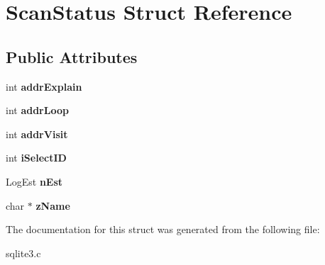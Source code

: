 \hypertarget{structScanStatus}{}\section{Scan\+Status Struct Reference}
\label{structScanStatus}
\subsection*{Public Attributes}
\begin{DoxyCompactItemize}
\item 
int {\bfseries addr\+Explain}\hypertarget{structScanStatus_a621d9ae1f07b7730f1e5e2a5a0473a2e}{}\label{structScanStatus_a621d9ae1f07b7730f1e5e2a5a0473a2e}

\item 
int {\bfseries addr\+Loop}\hypertarget{structScanStatus_a9a6acff15920d8de4b97a3d3fd6781d9}{}\label{structScanStatus_a9a6acff15920d8de4b97a3d3fd6781d9}

\item 
int {\bfseries addr\+Visit}\hypertarget{structScanStatus_a31523fd6dd0dfca1233b51606140b740}{}\label{structScanStatus_a31523fd6dd0dfca1233b51606140b740}

\item 
int {\bfseries i\+Select\+ID}\hypertarget{structScanStatus_a04e5536574db523ebfcdbecdfa39568a}{}\label{structScanStatus_a04e5536574db523ebfcdbecdfa39568a}

\item 
Log\+Est {\bfseries n\+Est}\hypertarget{structScanStatus_af8666388f46040047c5e4bc9097d0336}{}\label{structScanStatus_af8666388f46040047c5e4bc9097d0336}

\item 
char $\ast$ {\bfseries z\+Name}\hypertarget{structScanStatus_ae88705a0b24b1bde60c87cdbde902c24}{}\label{structScanStatus_ae88705a0b24b1bde60c87cdbde902c24}

\end{DoxyCompactItemize}


The documentation for this struct was generated from the following file\+:\begin{DoxyCompactItemize}
\item 
sqlite3.\+c\end{DoxyCompactItemize}
